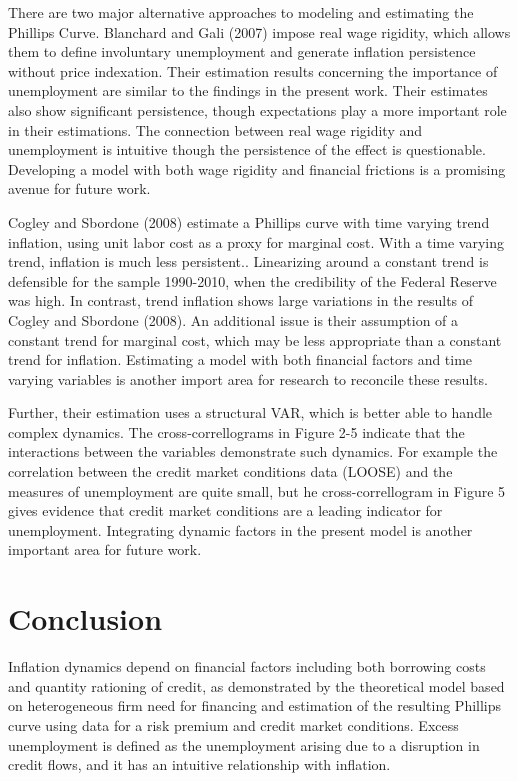 \documentclass{article}
\begin{document}
There are two major alternative approaches to modeling and estimating the
Phillips Curve. Blanchard and Gali (2007) impose real wage rigidity,
which allows them to define involuntary unemployment and generate inflation
persistence without price indexation. Their estimation results concerning
the importance of unemployment are similar to the findings in the present
work. Their estimates also show significant persistence, though
expectations play a more important role in their estimations. The
connection between real wage rigidity and unemployment is intuitive though
the persistence of the effect is questionable. Developing a model with
both wage rigidity and financial frictions is a promising avenue for future
work.

Cogley and Sbordone (2008) estimate a Phillips curve with time varying trend
inflation, using unit labor cost as a proxy for marginal cost. With a time
varying trend, inflation is much less persistent.. Linearizing around a
constant trend is defensible for the sample 1990-2010, when the credibility
of the Federal Reserve was high. In contrast, trend inflation shows large
variations in the results of Cogley and Sbordone (2008). An additional
issue is their assumption of a constant trend for marginal cost, which may
be less appropriate than a constant trend for inflation. Estimating a
model with both financial factors and time varying variables is another
import area for research to reconcile these results.

Further, their estimation uses a structural VAR, which is better able to
handle complex dynamics. The cross-correllograms in Figure 2-5 indicate
that the interactions between the variables demonstrate such dynamics. For
example the correlation between the credit market conditions data (LOOSE)
and the measures of unemployment are quite small, but he cross-correllogram
in Figure 5 gives evidence that credit market conditions are a leading
indicator for unemployment. Integrating dynamic factors in the present
model is another important area for future work.

\section{Conclusion}

Inflation dynamics depend on financial factors including both borrowing
costs and quantity rationing of credit, as demonstrated by the theoretical
model based on heterogeneous firm need for financing and estimation of the
resulting Phillips curve using data for a risk premium and credit market
conditions. Excess unemployment is defined as the unemployment arising due
to a disruption in credit flows, and it has an intuitive relationship with
inflation.
\end{document}
